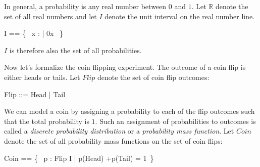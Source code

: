 \documentclass{article}
\begin{document}
\newcommand{\real}{\mathbb{R}}


\newcommand{\realzero}{0}

\newcommand{\realone}{1}


\newcommand{\reallt}{<}
\newcommand{\realleq}{\leq}
\newcommand{\realgt}{>}
\newcommand{\realgeq}{\geq}


In general, a probability is any real number between $0$ and $1$.
Let $\real$ denote the set of all real numbers and
let $I$ denote the unit interval on the real number line.
\begin{zed}
	I == \{~ x : \real |  \realzero \realleq x \realleq \realone   ~\}
\end{zed}
$I$ is therefore also the set of all probabilities.

Now let's formalize the coin flipping experiment.
The outcome of a coin flip is either heads or tails.
Let $Flip$ denote the set of coin flip outcomes:
\begin{zed}
	Flip ::= Head | Tail
\end{zed}

\newcommand{\realadd}{+}
\newcommand{\realsub}{-}
\newcommand{\realmul}{*}
\newcommand{\realdiv}{/}


We can model a coin by assigning a probability to each of the flip outcomes such that the total probability is $1$.
Such an assignment of probabilities to outcomes is called a  {\it discrete probability distribution} or a {\it probability mass function}.
Let $Coin$ denote the set of all probability mass functions on the set of coin flips:
\begin{zed}
	Coin == \{~ p : Flip \fun I | p(Head) \realadd p(Tail) = \realone ~\}
\end{zed}
\end{document}

